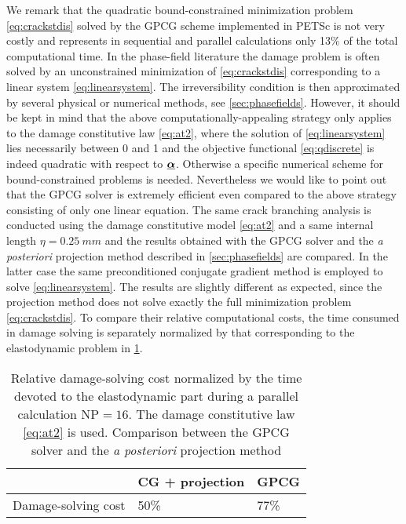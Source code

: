 We remark that the quadratic bound-constrained minimization problem \eqref{eq:crackstdis} solved by the GPCG scheme implemented in PETSc is not very costly and represents in sequential and parallel calculations only 13\% of the total computational time. In the phase-field literature the damage problem is often solved by an unconstrained minimization of \eqref{eq:crackstdis} corresponding to a linear system \cref{eq:linearsystem}. The irreversibility condition is then approximated by several physical or numerical methods, see \cref{sec:phasefields}. However, it should be kept in mind that the above computationally-appealing strategy only applies to the damage constitutive law \eqref{eq:at2}, where the solution of \eqref{eq:linearsystem} lies necessarily between 0 and 1 and the objective functional \eqref{eq:qdiscrete} is indeed quadratic with respect to $\dvec$. Otherwise a specific numerical scheme for bound-constrained problems is needed. Nevertheless we would like to point out that the GPCG solver is extremely efficient even compared to the above strategy consisting of only one linear equation. The same crack branching analysis is conducted using the damage constitutive model \eqref{eq:at2} and a same internal length $\eta=\SI{0.25}{mm}$ and the results obtained with the GPCG solver and the \emph{a posteriori} projection method described in \cref{sec:phasefields} are compared. In the latter case the same preconditioned conjugate gradient method is employed to solve \eqref{eq:linearsystem}. The results are slightly different as expected, since the projection method does not solve exactly the full minimization problem \eqref{eq:crackstdis}. To compare their relative computational costs, the time consumed in damage solving is separately normalized by that corresponding to the elastodynamic problem in \cref{tab:gpcg_vs_cg_proj}.
\begin{table}[htbp]
\centering
\caption{Relative damage-solving cost normalized by the time devoted to the elastodynamic part during a parallel calculation $\mathrm{NP}=16$. The damage constitutive law \eqref{eq:at2} is used. Comparison between the GPCG solver and the \emph{a posteriori} projection method} \label{tab:gpcg_vs_cg_proj}
\begin{tabular}{lll} \toprule
&  CG + projection & GPCG \\ \midrule
Damage-solving cost & 50\% & 77\% \\ \bottomrule
\end{tabular}
\end{table}

